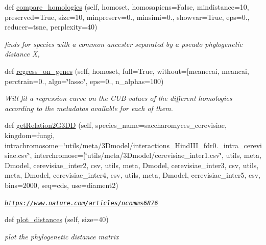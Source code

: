 \begin{DoxyCompactItemize}
def \mbox{\hyperlink{class_py_c_u_b_1_1py_c_u_b_1_1_py_c_u_b_ad350376cd68d4daacec78c694ed754c6}{compare\+\_\+homologies}} (self, homoset, homosapiens=False, mindistance=10, preserved=True, size=10, minpreserv=0., minsimi=0., showvar=True, eps=0., reducer=\textquotesingle{}tsne\textquotesingle{}, perplexity=40)
\begin{DoxyCompactList}\small\item\em finds for species with a common ancester separated by a pseudo phylogenetic distance X, \end{DoxyCompactList}\item 
def \mbox{\hyperlink{class_py_c_u_b_1_1py_c_u_b_1_1_py_c_u_b_a1b65efe7deb4ba5f65203c8be6fc7af2}{regress\+\_\+on\+\_\+genes}} (self, homoset, full=True, without=\mbox{[}\textquotesingle{}meanecai\textquotesingle{}, meancai, perctrain=0., algo=\char`\"{}lasso\char`\"{}, eps=0., n\+\_\+alphas=100)
\begin{DoxyCompactList}\small\item\em Will fit a regression curve on the C\+UB values of the different homologies according to the metadatas available for each of them. \end{DoxyCompactList}\item 
def \mbox{\hyperlink{class_py_c_u_b_1_1py_c_u_b_1_1_py_c_u_b_a06d83a29ac506b4a9422ef7e64eef0b0}{get\+Relation2\+G3\+DD}} (self, species\+\_\+name=\textquotesingle{}saccharomyces\+\_\+cerevisiae\textquotesingle{}, kingdom=\textquotesingle{}fungi\textquotesingle{}, intrachromosome=\char`\"{}utils/meta/3\+Dmodel/interactions\+\_\+\+Hind\+I\+I\+I\+\_\+fdr0.\+\_\+intra\+\_\+cerevisiae.\+csv\char`\"{}, interchromose=\mbox{[}\char`\"{}utils/meta/3\+Dmodel/cerevisiae\+\_\+inter1.\+csv\char`\"{}, utils, meta, Dmodel, cerevisiae\+\_\+inter2, csv, utils, meta, Dmodel, cerevisiae\+\_\+inter3, csv, utils, meta, Dmodel, cerevisiae\+\_\+inter4, csv, utils, meta, Dmodel, cerevisiae\+\_\+inter5, csv, bins=2000, seq=\textquotesingle{}cds\textquotesingle{}, use=\textquotesingle{}diament2\textquotesingle{})
\begin{DoxyCompactList}\small\item\em \href{https://www.nature.com/articles/ncomms6876}{\tt https\+://www.\+nature.\+com/articles/ncomms6876} \end{DoxyCompactList}\item 
def \mbox{\hyperlink{class_py_c_u_b_1_1py_c_u_b_1_1_py_c_u_b_a4e13b55153bbe774e9203818f2b7f690}{plot\+\_\+distances}} (self, size=40)
\begin{DoxyCompactList}\small\item\em plot the phylogenetic distance matrix \end{DoxyCompactList}\item 

\end{DoxyCompactItemize}
